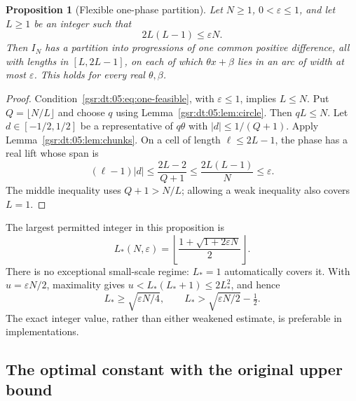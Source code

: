 \documentclass[11pt,letterpaper]{article}
\numberwithin{equation}{section}
\newtheorem{proposition}[theorem]{Proposition}
\theoremstyle{definition}
\theoremstyle{remark}
\newcommand{\1}{\mathbf 1}
\newcommand{\eps}{\varepsilon}
\begin{document}
\begin{proposition}[Flexible one-phase partition]
\label{gsr:dt:05:prop:flexible}
Let $N\geq1$, $0<\eps\leq1$, and let $L\geq1$ be an integer such that
\begin{equation}
 2L(L-1)\leq\eps N.
 \label{gsr:dt:05:eq:one-feasible}
\end{equation}
Then $I_N$ has a partition into progressions of one common positive difference, all with lengths in $[L,2L-1]$, on each of which $\theta x+\beta$ lies in an arc of width at most $\eps$. This holds for every real $\theta,\beta$.
\end{proposition}
\begin{proof}
Condition~\eqref{gsr:dt:05:eq:one-feasible}, with $\eps\leq1$, implies $L\leq N$. Put $Q=\lfloor N/L\rfloor$ and choose $q$ using Lemma~\ref{gsr:dt:05:lem:circle}. Then $qL\leq N$. Let $d\in[-1/2,1/2]$ be a representative of $q\theta$ with $|d|\leq1/(Q+1)$. Apply Lemma~\ref{gsr:dt:05:lem:chunks}. On a cell of length $\ell\leq2L-1$, the phase has a real lift whose span is
\[
 (\ell-1)|d|\leq\frac{2L-2}{Q+1}
 \leq\frac{2L(L-1)}N\leq\eps.
\]
The middle inequality uses $Q+1>N/L$; allowing a weak inequality also covers $L=1$.
\end{proof}

The largest permitted integer in this proposition is
\begin{equation}
 L_*(N,\eps)=\left\lfloor\frac{1+\sqrt{1+2\eps N}}2\right\rfloor.
 \label{gsr:dt:05:eq:Lstar}
\end{equation}
There is no exceptional small-scale regime: $L_*=1$ automatically covers it. With $u=\eps N/2$, maximality gives $u<L_*(L_*+1)\leq2L_*^2$, and hence
\begin{equation}
 L_*\geq\sqrt{\eps N/4},\qquad
 L_*>\sqrt{\eps N/2}-\tfrac12.
 \label{gsr:dt:05:eq:Lstar-lower}
\end{equation}
The exact integer value, rather than either weakened estimate, is preferable in implementations.

\subsection{The optimal constant with the original upper bound}
\end{document}
